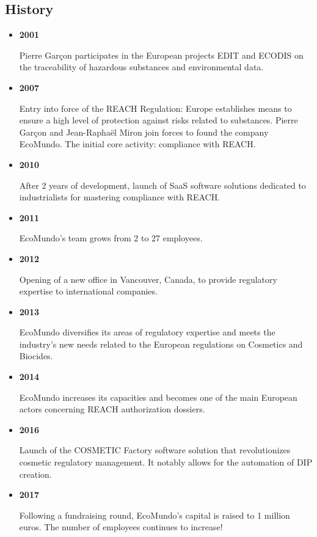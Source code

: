 \documentclass[a4paper,12pt,twoside]{report}
\begin{document}
\subsection{History}
\begin{itemize}
\item \textbf{2001}

Pierre Garçon participates in the European projects EDIT and ECODIS on the traceability of hazardous substances and environmental data.

\item \textbf{2007}

Entry into force of the REACH Regulation: Europe establishes means to ensure a high level of protection against risks related to substances. Pierre Garçon and Jean-Raphaël Miron join forces to found the company EcoMundo. The initial core activity: compliance with REACH.

\item \textbf{2010}

After 2 years of development, launch of SaaS software solutions dedicated to industrialists for mastering compliance with REACH.

\item \textbf{2011}

EcoMundo's team grows from 2 to 27 employees.

\item \textbf{2012}

Opening of a new office in Vancouver, Canada, to provide regulatory expertise to international companies.

\item \textbf{2013}

EcoMundo diversifies its areas of regulatory expertise and meets the industry's new needs related to the European regulations on Cosmetics and Biocides.

\item \textbf{2014}

EcoMundo increases its capacities and becomes one of the main European actors concerning REACH authorization dossiers.

\item \textbf{2016}

Launch of the COSMETIC Factory software solution that revolutionizes cosmetic regulatory management. It notably allows for the automation of DIP creation.

\item \textbf{2017}

Following a fundraising round, EcoMundo's capital is raised to 1 million euros. The number of employees continues to increase!


\end{itemize}
\end{document}
